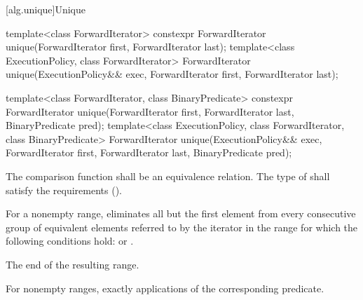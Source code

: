 [alg.unique]{Unique}

%
\begin{itemdecl}
template<class ForwardIterator>
  constexpr ForwardIterator unique(ForwardIterator first, ForwardIterator last);
template<class ExecutionPolicy, class ForwardIterator>
  ForwardIterator unique(ExecutionPolicy&& exec,
                         ForwardIterator first, ForwardIterator last);

template<class ForwardIterator, class BinaryPredicate>
  constexpr ForwardIterator unique(ForwardIterator first, ForwardIterator last,
                                   BinaryPredicate pred);
template<class ExecutionPolicy, class ForwardIterator, class BinaryPredicate>
  ForwardIterator unique(ExecutionPolicy&& exec,
                         ForwardIterator first, ForwardIterator last,
                         BinaryPredicate pred);
\end{itemdecl}

\begin{itemdescr}
\pnum
\requires
The comparison function shall be an equivalence relation.
The type of  shall satisfy the
 requirements ().

\pnum
\effects
For a nonempty range, eliminates all but the first element from every
consecutive group of equivalent elements referred to by the iterator
in the range
for which the following conditions hold:
or
.

\pnum
\returns
The end of the resulting range.

\pnum
\complexity
For nonempty ranges, exactly
applications of the corresponding predicate.
\end{itemdescr}

